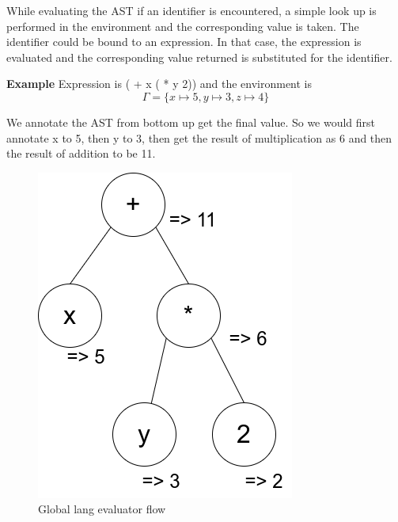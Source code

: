     While evaluating the AST if an identifier is encountered, a simple look up is performed in the environment and the corresponding value is taken. The identifier could be bound to an expression. In that case, the expression is evaluated and the corresponding value returned is substituted for the identifier.

    \textbf{Example}
    Expression is ( + x ( * y 2)) and the environment is 
    $$\Gamma = \{ x \mapsto 5, y \mapsto 3, z \mapsto 4\}$$

    We annotate the AST from bottom up get the final value. So we would first annotate x to 5, then y to 3, then get the result of multiplication as 6 and then the result of addition to be 11.

    \begin{figure}[htbp]
        \center
        \includegraphics[scale=0.6]{images/lecture7/global_ex_ast.png}
        \caption{Global lang evaluator flow}
    \end{figure}
    
    
